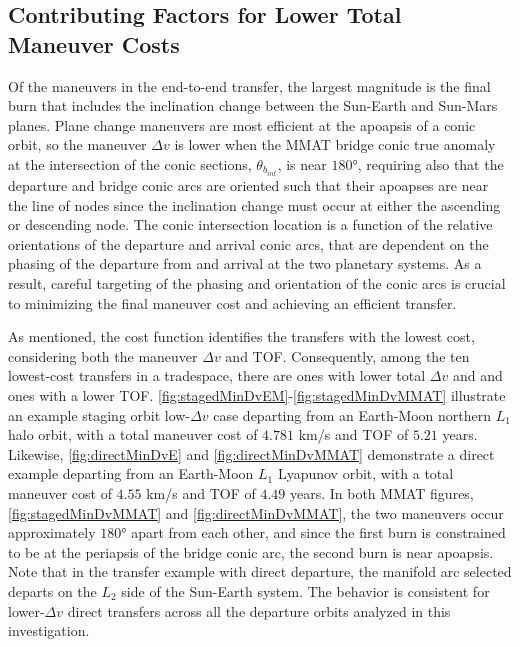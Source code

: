 \subsection{Contributing Factors for Lower Total Maneuver Costs}
Of the maneuvers in the end-to-end transfer, the largest magnitude is the final burn that includes
the inclination change between the Sun-Earth and Sun-Mars planes. Plane change maneuvers are most
efficient at the apoapsis of a conic orbit, so the maneuver $\Delta v$ is lower when the MMAT
bridge conic true anomaly at the intersection of the conic sections, $\theta_{b_{int}}$, is near
$\ang{180}$, requiring also that the departure and bridge conic arcs are oriented such that their
apoapses are near the line of nodes since the inclination change must occur at either the ascending
or descending node. The conic intersection location is a function of the relative orientations of
the departure and arrival conic arcs, that are dependent on the phasing of the departure from and
arrival at the two planetary systems. As a result, careful targeting of the phasing and orientation
of the conic arcs is crucial to minimizing the final maneuver cost and achieving an efficient
transfer.

As mentioned, the cost function identifies the transfers with the lowest cost, considering both the
maneuver $\Delta v$ and TOF. Consequently, among the ten lowest-cost transfers in a tradespace,
there are ones with lower total $\Delta v$ and and ones with a lower TOF.
\cref{fig:stagedMinDvEM}-\cref{fig:stagedMinDvMMAT} illustrate an example staging orbit
low-$\Delta v$ case departing from an Earth-Moon northern $L_{1}$ halo orbit, with a total maneuver
cost of $4.781$ km/s and TOF of $5.21$ years. Likewise, \cref{fig:directMinDvE} and
\cref{fig:directMinDvMMAT} demonstrate a direct example departing from an Earth-Moon $L_{1}$
Lyapunov orbit, with a total maneuver cost of $4.55$ km/s and TOF of $4.49$ years. In both MMAT
figures, \cref{fig:stagedMinDvMMAT} and \cref{fig:directMinDvMMAT}, the two maneuvers occur
approximately $\ang{180}$ apart from each other, and since the first burn is constrained to be at
the periapsis of the bridge conic arc, the second burn is near apoapsis. Note that in the transfer
example with direct departure, the manifold arc selected departs on the $L_{2}$ side of the
Sun-Earth system. The behavior is consistent for lower-$\Delta v$ direct transfers across all the
departure orbits analyzed in this investigation.
\vspace{30mm}

